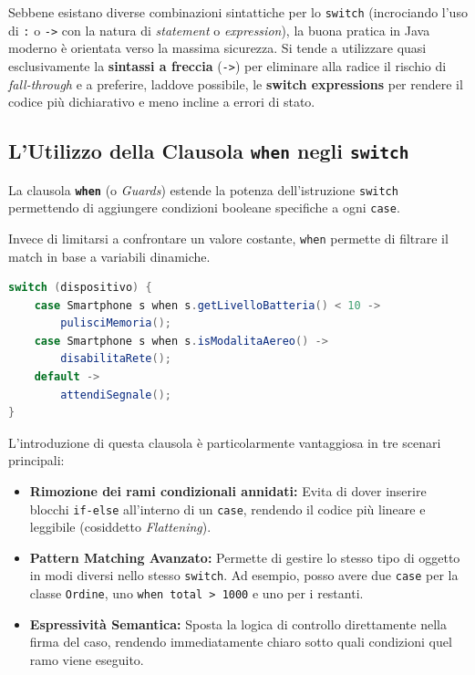 \begin{tip}[]
    Sebbene esistano diverse combinazioni sintattiche per lo \texttt{switch} (incrociando l'uso di \texttt{:} o \texttt{->} con la natura di \textit{statement} o \textit{expression}), la buona pratica in Java moderno è orientata verso la massima sicurezza. Si tende a utilizzare quasi esclusivamente la \textbf{sintassi a freccia} (\texttt{->}) per eliminare alla radice il rischio di \textit{fall-through} e a preferire, laddove possibile, le \textbf{switch expressions} per rendere il codice più dichiarativo e meno incline a errori di stato.
\end{tip}

\subsection{L'Utilizzo della Clausola \texttt{when} negli \texttt{switch}}

La clausola \textbf{\texttt{when}} (o \textit{Guards}) estende la potenza dell'istruzione \texttt{switch} permettendo di aggiungere condizioni booleane specifiche a ogni \texttt{case}.

Invece di limitarsi a confrontare un valore costante, \texttt{when} permette di filtrare il match in base a variabili dinamiche.

\begin{lstlisting}[language=Java, caption=Esempio di Pattern Matching con clausola when]
switch (dispositivo) {
    case Smartphone s when s.getLivelloBatteria() < 10 -> 
        pulisciMemoria();
    case Smartphone s when s.isModalitaAereo() -> 
        disabilitaRete();
    default -> 
        attendiSegnale();
}
\end{lstlisting}

L'introduzione di questa clausola è particolarmente vantaggiosa in tre scenari principali:

\begin{itemize}
    \item \textbf{Rimozione dei rami condizionali annidati:} Evita di dover inserire blocchi \texttt{if-else} all'interno di un \texttt{case}, rendendo il codice più lineare e leggibile (cosiddetto \textit{Flattening}).
    \item \textbf{Pattern Matching Avanzato:} Permette di gestire lo stesso tipo di oggetto in modi diversi nello stesso \texttt{switch}. Ad esempio, posso avere due \texttt{case} per la classe \texttt{Ordine}, uno \texttt{when total > 1000} e uno per i restanti.
    \item \textbf{Espressività Semantica:} Sposta la logica di controllo direttamente nella firma del caso, rendendo immediatamente chiaro sotto quali condizioni quel ramo viene eseguito.
\end{itemize}

